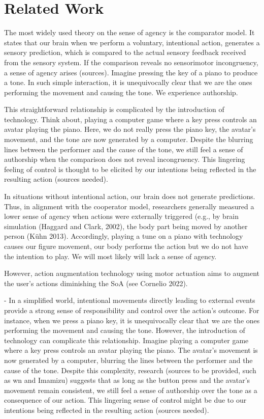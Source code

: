 \section{Related Work}



The most widely used theory on the sense of agency is the comparator model. It states that our brain when we perform a voluntary, intentional action, generates a sensory prediction, which is compared to the actual sensory feedback received from the sensory system. If the comparison reveals no sensorimotor incongruency, a sense of agency arises (sources). Imagine pressing the key of a piano to produce a tone. In such simple interaction, it is unequivocally clear that we are the ones performing the movement and causing the tone. We experience authorship. 

This straightforward relationship is complicated by the introduction of technology. Think about, playing a computer game where a key press controls an avatar playing the piano. Here, we do not really press the piano key, the avatar's movement, and the tone are now generated by a computer. Despite the blurring lines between the performer and the cause of the tone, we still feel a sense of authorship when the comparison does not reveal incongruency. This lingering feeling of control is thought to be elicited by our intentions being reflected in the resulting action (sources needed). 

In situations without intentional action, our brain does not generate predictions. Thus, in alignment with the cooperator model, researchers generally measured a lower sense of agency when actions were externally triggered (e.g., by brain simulation (Haggard and Clark, 2002), the body part being moved by another person (Kühn 2013). Accordingly, playing a tune on a piano with technology causes our figure movement, our body performs the action but we do not have the intention to play. We will most likely will lack a sense of agency.



However, action augmentation technology using motor actuation aims to augment the user’s actions diminishing the SoA (see Cornelio 2022). 



- %
In a simplified world, intentional movements directly leading to external events provide a strong sense of responsibility and control over the action's outcome. For instance, when we press a piano key, it is unequivocally clear that we are the ones performing the movement and causing the tone. However, the introduction of technology can complicate this relationship. Imagine playing a computer game where a key press controls an avatar playing the piano. The avatar's movement is now generated by a computer, blurring the lines between the performer and the cause of the tone. Despite this complexity, research (sources to be provided, such as wn and Imamizu) suggests that as long as the button press and the avatar's movement remain consistent, we still feel a sense of authorship over the tone as a consequence of our action. This lingering sense of control might be due to our intentions being reflected in the resulting action (sources needed). 

